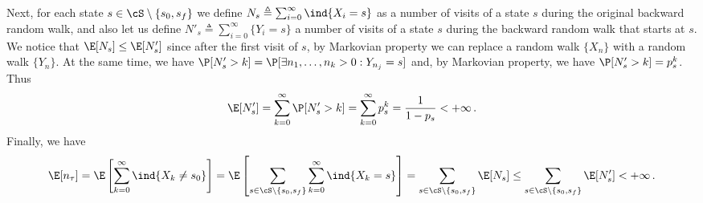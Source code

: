 Next, for each state $s \in \cS \setminus \{s_0, s_f\}$ we define $N_s \triangleq \sum_{i=0}^\infty \ind\{ X_i = s \}$ as a number of visits of a state $s$ during the original backward random walk, and also let us define $N'_s \triangleq \sum_{i=0}^\infty\{ Y_i = s\}$ a number of visits of a state $s$ during the backward random walk that starts at $s$. We notice that $\E[N_{s}] \leq \E[N_{s}']$ since after the first visit of $s$, by Markovian property we can replace a random walk $\{X_n\}$ with a random walk $\{Y_n\}$. At the same time, we have $\P[N'_s > k] = \P[\exists n_1, \ldots, n_k > 0: Y_{n_j} = s ]$ and, by Markovian property, we have $\P[N'_s > k] = p_s^k$. Thus
\[
    \E[N'_s] = \sum_{k=0}^\infty \P[N'_s > k] = \sum_{k=0}^\infty p_s^k = \frac{1}{1-p_s} < +\infty\,.
\]
Finally, we have
\[
    \E[n_{\tau}] = \E\left[\sum_{k=0}^\infty \ind\{X_k \not = s_0\}\right] = \E\left[\sum_{s \in \cS \setminus\{s_0, s_f\}} \sum_{k=0}^\infty \ind\{X_k = s\}\right] = \sum_{s \in \cS \setminus\{s_0, s_f\}} \E[N_s] \leq \sum_{s \in \cS \setminus\{s_0, s_f\}} \E[N_s'] < +\infty\,.  
\]






